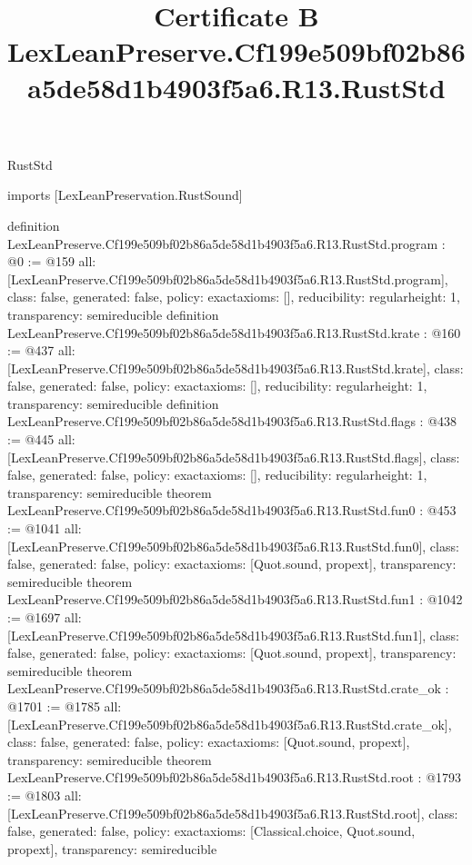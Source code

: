 \begin{lexlean}{RustStd}
\title{Certificate B LexLeanPreserve.Cf199e509bf02b86a5de58d1b4903f5a6.R13.RustStd}
\begin{coremodule}
imports [LexLeanPreservation.RustSound]

definition LexLeanPreserve.Cf199e509bf02b86a5de58d1b4903f5a6.R13.RustStd.program : @0 := @159 {
  all: [LexLeanPreserve.Cf199e509bf02b86a5de58d1b4903f5a6.R13.RustStd.program],
  class: false,
  generated: false,
  policy: exact{axioms: []},
  reducibility: regular{height: 1},
  transparency: semireducible
}
definition LexLeanPreserve.Cf199e509bf02b86a5de58d1b4903f5a6.R13.RustStd.krate : @160 := @437 {
  all: [LexLeanPreserve.Cf199e509bf02b86a5de58d1b4903f5a6.R13.RustStd.krate],
  class: false,
  generated: false,
  policy: exact{axioms: []},
  reducibility: regular{height: 1},
  transparency: semireducible
}
definition LexLeanPreserve.Cf199e509bf02b86a5de58d1b4903f5a6.R13.RustStd.flags : @438 := @445 {
  all: [LexLeanPreserve.Cf199e509bf02b86a5de58d1b4903f5a6.R13.RustStd.flags],
  class: false,
  generated: false,
  policy: exact{axioms: []},
  reducibility: regular{height: 1},
  transparency: semireducible
}
theorem LexLeanPreserve.Cf199e509bf02b86a5de58d1b4903f5a6.R13.RustStd.fun0 : @453 := @1041 {
  all: [LexLeanPreserve.Cf199e509bf02b86a5de58d1b4903f5a6.R13.RustStd.fun0],
  class: false,
  generated: false,
  policy: exact{axioms: [Quot.sound, propext]},
  transparency: semireducible
}
theorem LexLeanPreserve.Cf199e509bf02b86a5de58d1b4903f5a6.R13.RustStd.fun1 : @1042 := @1697 {
  all: [LexLeanPreserve.Cf199e509bf02b86a5de58d1b4903f5a6.R13.RustStd.fun1],
  class: false,
  generated: false,
  policy: exact{axioms: [Quot.sound, propext]},
  transparency: semireducible
}
theorem LexLeanPreserve.Cf199e509bf02b86a5de58d1b4903f5a6.R13.RustStd.crate_ok : @1701 := @1785 {
  all: [LexLeanPreserve.Cf199e509bf02b86a5de58d1b4903f5a6.R13.RustStd.crate_ok],
  class: false,
  generated: false,
  policy: exact{axioms: [Quot.sound, propext]},
  transparency: semireducible
}
theorem LexLeanPreserve.Cf199e509bf02b86a5de58d1b4903f5a6.R13.RustStd.root : @1793 := @1803 {
  all: [LexLeanPreserve.Cf199e509bf02b86a5de58d1b4903f5a6.R13.RustStd.root],
  class: false,
  generated: false,
  policy: exact{axioms: [Classical.choice, Quot.sound, propext]},
  transparency: semireducible
}


\end{coremodule}
\end{lexlean}
